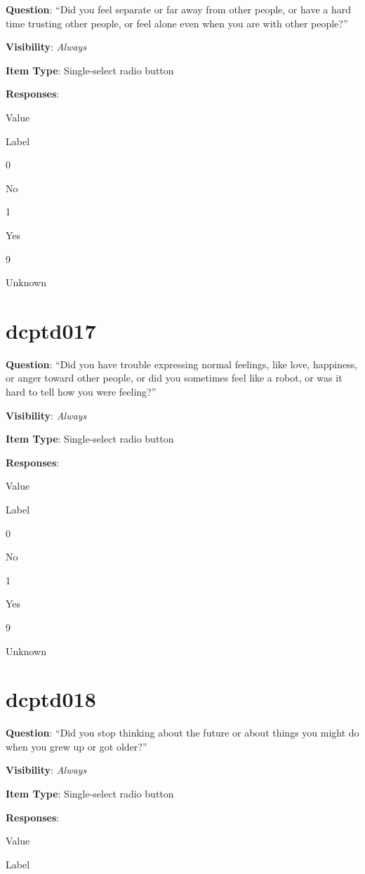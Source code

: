 \documentclass[]{book}
\begin{document}
\textbf{Question}: ``Did you feel separate or far away from other people, or have a hard time trusting other people, or feel alone even when you are with other people?''

\textbf{Visibility}: \emph{Always}

\textbf{Item Type}: Single-select radio button

\textbf{Responses}:

Value

Label

0

No

1

Yes

9

Unknown

\hypertarget{dcptd017}{%
\section{dcptd017}\label{dcptd017}}

\textbf{Question}: ``Did you have trouble expressing normal feelings, like love, happiness, or anger toward other people, or did you sometimes feel like a robot, or was it hard to tell how you were feeling?''

\textbf{Visibility}: \emph{Always}

\textbf{Item Type}: Single-select radio button

\textbf{Responses}:

Value

Label

0

No

1

Yes

9

Unknown

\hypertarget{dcptd018}{%
\section{dcptd018}\label{dcptd018}}

\textbf{Question}: ``Did you stop thinking about the future or about things you might do when you grew up or got older?''

\textbf{Visibility}: \emph{Always}

\textbf{Item Type}: Single-select radio button

\textbf{Responses}:

Value

Label
\end{document}
